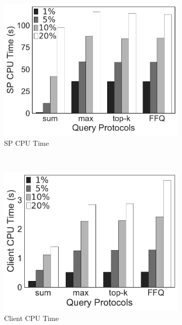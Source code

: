 \begin{figure}[t]
  \centering
  \begin{subfigure}[b]{.31\linewidth}
    \centering
    \includegraphics[width=\linewidth]{exp-figs/aggregate-queries/foodmarket_sp.pdf}
    \caption{SP CPU Time}
  \end{subfigure}~%
  \begin{subfigure}[b]{.3\linewidth}
    \centering
    \includegraphics[width=\linewidth]{exp-figs/aggregate-queries/foodmarket_client.pdf}
    \caption{Client CPU Time}
  \end{subfigure}~%
  \begin{subfigure}[b]{.37\linewidth}
    \centering

\end{subfigure}
\end{figure}
